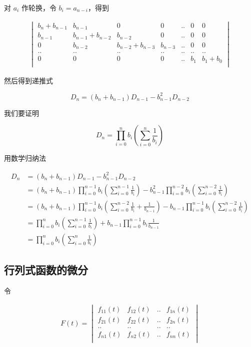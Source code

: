 \documentclass[12pt,a4paper]{ctexart}
\begin{document}
对 $a_i$ 作轮换，令 $b_i = a_{n-i}$，得到

\begin{align*}
    \begin{vmatrix}
        b_n + b_{n-1} & b_{n-1} & 0 & 0 & .. & 0 & 0 \\
        b_{n-1} & b_{n-1} + b_{n-2} & b_{n-2} & 0 & .. & 0 & 0 \\
        0 & b_{n-2} & b_{n-2} + b_{n-3} & b_{n-3} & .. & 0 & 0 \\
        ..& ..&..&..&..& .. & .. \\
        0 & 0 & 0 & 0 & .. & b_1 & b_1 + b_0 \\
    \end{vmatrix}
\end{align*}

然后得到递推式

\[
D_n = (b_n + b_{n-1})D_{n-1} - b_{n-1}^{2}D_{n-2}
\]

我们要证明 

\[
D_n = \prod_{i=0}^{n}b_i\left( \sum_{i=0}^{n}\frac{1}{b_i} \right)
\]

用数学归纳法

\begin{align*}
D_n &= (b_n + b_{n-1})D_{n-1} - b_{n-1}^{2}D_{n-2} \\
    &= (b_n + b_{n-1})\prod_{i=0}^{n-1}b_i\left( \sum_{i=0}^{n-1}\frac{1}{b_i} \right) - b_{n-1}^2 \prod_{i=0}^{n-2}b_i\left( \sum_{i=0}^{n-2}\frac{1}{b_i} \right) \\
    &= (b_n + b_{n-1})\prod_{i=0}^{n-1}b_i\left( \sum_{i=0}^{n-2}\frac{1}{b_i} + \frac{1}{b_{n-1}} \right) - b_{n-1} \prod_{i=0}^{n-1}b_i\left( \sum_{i=0}^{n-2}\frac{1}{b_i} \right) \\
    &= \prod_{i=0}^{n}b_i\left( \sum_{i=0}^{n-1}\frac{1}{b_i} \right) + b_{n-1}\prod_{i=0}^{n-1}b_i \frac{1}{b_{n-1}} \\
    &= \prod_{i=0}^{n}b_i\left( \sum_{i=0}^{n}\frac{1}{b_i} \right)
\end{align*}

\subsection{行列式函数的微分}

令

\begin{align*}
    F(t) = \begin{vmatrix}
        f_{11}(t) & f_{12}(t) & .. & f_{1n}(t)\\
        f_{21}(t) & f_{22}(t) & .. & f_{2n}(t)\\
        .. & .. & .. & .. \\
        f_{n1}(t) & f_{n2}(t) & .. & f_{nn}(t)\\
    \end{vmatrix}
\end{align*}
\end{document}

